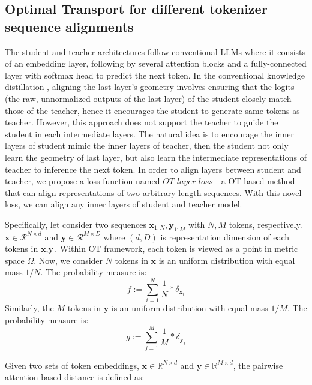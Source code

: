 \subsection{Optimal Transport for different tokenizer sequence alignments}

The student and teacher architectures follow conventional LLMs where it consists of an embedding layer, following by several attention blocks and a fully-connected layer with softmax head to predict the next token. In the conventional knowledge distillation \cite{hinton2015distilling}, aligning the last layer's geometry involves ensuring that the logits (the raw, unnormalized outputs of the last layer) of the student closely match those of the teacher, hence it encourages the student to generate same tokens as teacher. However, this approach does not support the teacher to guide the student in each intermediate layers. The natural idea is to encourage the inner layers of student mimic the inner layers of teacher, then the student not only learn the geometry of last layer, but also learn the intermediate representations of teacher to inference the next token. In order to align layers between student and teacher, we propose a loss function named $OT\_layer\_loss$ - a OT-based method that can align representations of two arbitrary-length sequences. With this novel loss, we can align any inner layers of student and teacher model.

Specifically, let consider two sequences $\textbf{x}_{1:N}, \textbf{y}_{1:M}$ with $N,M$ tokens, respectively. $\textbf{x} \in \mathcal{R}^{N\times d}$ and $\textbf{y} \in \mathcal{R}^{M\times D}$ where $(d, D)$ is representation dimension of each tokens in $\textbf{x}, \textbf{y}$. Within OT framework, each token is viewed as a point in metric space $\Omega$. Now, we consider $N$ tokens in $\textbf{x}$ is an uniform distribution with equal mass $1/N$. The probability measure is:
\begin{equation}
    f := \sum_{i=1}^N \frac{1}{N}*\delta_{\textbf{x}_i}
\end{equation}
Similarly, the $M$ tokens in $\textbf{y}$ is an uniform distribution with equal mass $1/M$. The probability measure is:
\begin{equation}
    g := \sum_{j=1}^M \frac{1}{M}*\delta_{\textbf{y}_j}
\end{equation}

Given two sets of token embeddings, $\mathbf{x} \in \mathbb{R}^{N \times d}$ and $\mathbf{y} \in \mathbb{R}^{M \times d}$, the pairwise attention-based distance is defined as:

